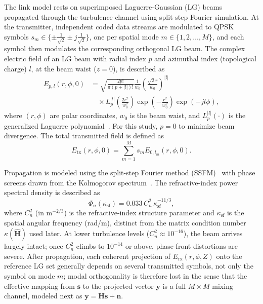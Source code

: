 \documentclass[journal]{IEEEtran}
\begin{document}
The link model rests on superimposed Laguerre-Gaussian (LG) beams propagated through the turbulence channel using split-step Fourier simulation. At the transmitter, independent coded data streams are modulated to QPSK symbols $s_m \in \{ \pm \frac{1}{\sqrt{2}} \pm j\frac{1}{\sqrt{2}} \}$, one per spatial mode $m \in \{1, 2, \dots, M\}$, and each symbol then modulates the corresponding orthogonal LG beam. The complex electric field of an LG beam with radial index $p$ and azimuthal index (topological charge) $l$, at the beam waist ($z=0$), is described as
\begin{equation}
\label{eq:lg_beam}
\begin{split}
    E_{p,l}(r, \phi, 0) &= \sqrt{\frac{2 p!}{\pi (p + |l|)!}} \frac{1}{w_0} \left( \frac{\sqrt{2} r}{w_0} \right)^{|l|} \\
    &\quad \times L_p^{|l|}\left( \frac{2 r^2}{w_0^2} \right) \exp\left( -\frac{r^2}{w_0^2} \right) \exp(-j l \phi),
\end{split}
\end{equation}
where $(r, \phi)$ are polar coordinates, $w_0$ is the beam waist, and $L_p^{|l|}(\cdot)$ is the generalized Laguerre polynomial~\cite{allen1992orbital}. For this study, $p=0$ to minimize beam divergence. The total transmitted field is defined as
\begin{equation}
\label{eq:tx_field}
    E_{\mathrm{tx}}(r, \phi, 0) = \sum_{m=1}^{M} s_m E_{0, l_m}(r, \phi, 0).
\end{equation}

Propagation is modeled using the split-step Fourier method (SSFM)~\cite{schmidt2010numerical} with phase screens drawn from the Kolmogorov spectrum~\cite{andrews2005laser, tatarskii1971wave}. The refractive-index power spectral density is described as
\begin{equation}
\label{eq:kolmogorov}
    \Phi_{n}(\kappa_{\mathrm{sf}}) = 0.033\, C_n^2\, \kappa_{\mathrm{sf}}^{-11/3},
\end{equation}
where $C_n^2$ (in m$^{-2/3}$) is the refractive-index structure parameter and $\kappa_{\mathrm{sf}}$ is the spatial angular frequency (rad/m), distinct from the matrix condition number $\kappa(\hat{\mathbf{H}})$ used later. At lower turbulence levels ($C_n^2 \approx 10^{-16}$), the beam arrives largely intact; once $C_n^2$ climbs to $10^{-14}$ or above, phase-front distortions are severe. After propagation, each coherent projection of $E_{\mathrm{rx}}(r, \phi, Z)$ onto the reference LG set generally depends on several transmitted symbols, not only the symbol on mode $m$; modal orthogonality is therefore lost in the sense that the effective mapping from $\mathbf{s}$ to the projected vector $\mathbf{y}$ is a full $M \times M$ mixing channel, modeled next as $\mathbf{y} = \mathbf{H}\mathbf{s} + \mathbf{n}$.
\end{document}
